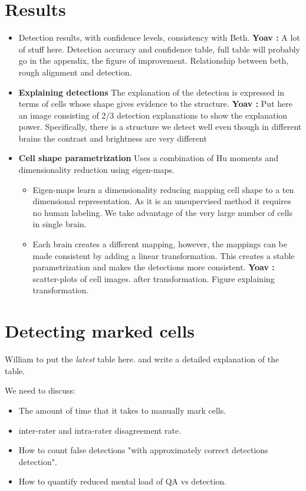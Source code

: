 \documentclass[runningheads]{llncs}
\newcommand{\comment}[3]{{\color{#1} {\bf #2 :} #3}}
\newcommand{\yoav}[1]{\comment{purple}{Yoav}{#1}}
\begin{document}
\section{Results}

\begin{itemize}
    \item Detection results, with confidence levels, consistency with Beth.
    \yoav{A lot of stuff here. Detection accuracy and confidence table, full table will probably go in the appendix, the figure of improvement. Relationship between beth, rough alignment and detection.}
    \item {\bf Explaining detections} The explanation of the detection is expressed in terms of cells whose shape gives evidence to the structure.
    \yoav{Put here an image consisting of 2/3 detection explanations to show the explanation power. Specifically, there is a structure we detect well even though in different brains the contrast and brightness are very different}
\item {\bf Cell shape parametrization} Uses a combination of Hu moments and dimensionality reduction using eigen-maps.
\begin{itemize}
    \item Eigen-maps learn a dimensionality reducing mapping cell shape to a ten dimensional representation.
    As it is an unsupervised method it requires no human labeling. We take advantage of the very large number of cells in single brain. 
    \item Each brain creates a different mapping, however, the mappings can be made consistent by adding a linear transformation. This creates a stable parametrization and makes the detections more consistent.\yoav{scatter-plots of cell images. after transformation. Figure explaining transformation.}
\end{itemize}

\end{itemize}

\section{Detecting marked cells}

William to put the {\em latest} table here. and write a detailed
explanation of the table.

We need to discuss:
\begin{itemize}
\item The amount of time that it takes to manually mark cells.
\item inter-rater and intra-rater disagreement rate.
\item How to count false detections "with approximately correct
  detections detection".
\item How to quantify reduced mental load of QA vs detection.
\end{itemize}
\end{document}
